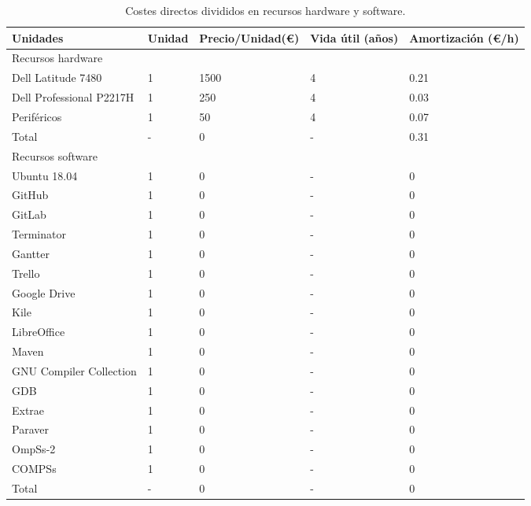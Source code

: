 \begin{table}[ht!]
\centering
 \begin{tabular}{| l | l | l | l | l |}
    \hline
    Unidades & Unidad & Precio/Unidad(\euro) & Vida útil (años) & Amortización (\euro/h) \\
    \hline
    \cline{1-1}
    \rowcolor{gray!50}
    Recursos hardware \\
    \hline
    Dell Latitude 7480          & 1 & 1500  & 4 & 0.21\\
    \hline 
    Dell Professional P2217H    & 1 & 250   & 4 & 0.03\\
    \hline
    Periféricos                 & 1 & 50    & 4 & 0.07\\
    \hline
    \rowcolor{gray!50}
    Total                       & - & 0     & - & 0.31\\
    \hline
    \cline{1-1}
    \rowcolor{gray!50}
    Recursos software \\
    \hline
    Ubuntu 18.04                & 1 & 0     & - & 0\\
    \hline
    GitHub                      & 1 & 0     & - & 0\\
    \hline
    GitLab                      & 1 & 0     & - & 0\\
    \hline
    Terminator                  & 1 & 0     & - & 0\\
    \hline
    Gantter                     & 1 & 0     & - & 0\\
    \hline
    Trello                      & 1 & 0     & - & 0\\
    \hline
    Google Drive                & 1 & 0     & - & 0\\
    \hline
    Kile                        & 1 & 0     & - & 0\\
    \hline
    LibreOffice                 & 1 & 0     & - & 0\\
    \hline
    Maven                       & 1 & 0     & - & 0\\
    \hline
    GNU Compiler Collection     & 1 & 0     & - & 0\\
    \hline
    GDB                         & 1 & 0     & - & 0\\
    \hline
    Extrae                      & 1 & 0     & - & 0\\
    \hline
    Paraver                     & 1 & 0     & - & 0\\
    \hline
    OmpSs-2                     & 1 & 0     & - & 0\\
    \hline
    COMPSs                      & 1 & 0     & - & 0\\
    \hline
    \rowcolor{gray!50}
    Total                       & - & 0     & - & 0\\
    \hline
 \end{tabular}
\caption{Costes directos divididos en recursos hardware y software.}
\end{table}


